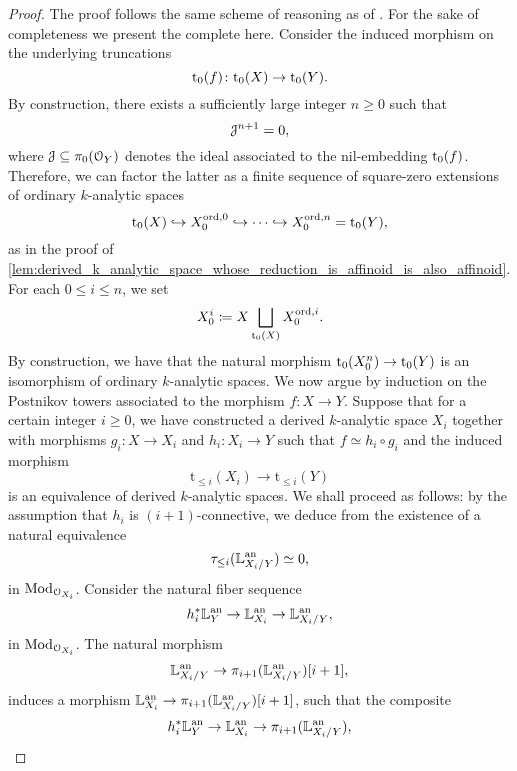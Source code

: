 \documentclass[10pt,a4paper,reqno]{amsart} %
\theoremstyle{plain}
\theoremstyle{definition}
\theoremstyle{remark}
\numberwithin{equation}{section}
\begin{document}
\begin{proof}
    The proof follows the same scheme of reasoning as of \cite[Proposition 5.5.3]{Gaitsgory_Study_II}. For the sake of completeness we present the complete here.
    Consider the induced morphism on the underlying truncations
        \[
            \mathrm{t}_0(f) \colon \mathrm{t}_0(X) \to \mathrm{t}_0(Y).   
        \]
    By construction, there exists a sufficiently large integer $n \ge 0$ such that
        \[
            \mathcal J^{n+1} = 0,  
        \]
    where $\mathcal J \subseteq \pi_0(\mathcal O_Y)$ denotes the ideal associated to the nil-embedding $\mathrm{t}_0(f)$.
    Therefore, we can factor the latter as a finite sequence of square-zero extensions of ordinary $k$-analytic spaces
        \[
            \mathrm{t}_0(X) \hookrightarrow X_0^{\mathrm{ord}, 0} \hookrightarrow \dots \hookrightarrow X^{\mathrm{ord}, n}_0 = \mathrm{t}_0(Y),
        \]
    as in the proof of \cref{lem:derived_k_analytic_space_whose_reduction_is_affinoid_is_also_affinoid}. For each $0 \le i \le n$, we set
        \[
            X_0^i \coloneqq X \bigsqcup_{\mathrm{t}_0(X)} X_0^{\mathrm{ord}, i}.
        \]
    By construction, we have that the natural morphism $\mathrm{t}_0(X_0^n) \to \mathrm{t}_0(Y)$ is an isomorphism of ordinary $k$-analytic spaces.
    We now argue by induction on the Postnikov towers associated to the morphism $f \colon X \to Y$.
    Suppose that for a certain integer $i \ge 0$, we have constructed a derived $k$-analytic space $X_i$ together with morphisms $g_i \colon
    X \to X_i$ and $h_i \colon X_i \to Y$ such that $f \simeq h_i \circ g_i$
    and the induced morphism
        \[
            \mathrm{t}_{\le i}(X_i) \to \mathrm{t}_{\le i}(Y)
        \]
    is an equivalence of derived $k$-analytic spaces. We shall proceed as follows: by the assumption that $h_i$ is $(i+1)$-connective, we deduce from
    \cite[Proposition 5.34]{Porta_Yu_Representability} the existence of a natural equivalence
        \[
            \tau_{\le i}(\mathbb L_{X_i/Y}^\mathrm{an}) \simeq 0,
        \]
    in $\mathrm{Mod}_{\mathcal O_{X_i}}$. Consider the natural fiber sequence
        \[
            h_i^* \mathbb L^\mathrm{an}_{Y} \to \mathbb L^\mathrm{an}_{X_i} \to \mathbb L^\mathrm{an}_{X_i/Y},
        \]
    in $\mathrm{Mod}_{\mathcal O_{X_i}}$. The natural morphism
        \[
            \mathbb L^\mathrm{an}_{X_i/ Y} \to \pi_{i+1}(\mathbb L^\mathrm{an}_{X_i/Y})[i+1],  
        \]
    induces a morphism $\mathbb L^\mathrm{an}_{X_i} \to \pi_{i+1}(\mathbb L^\mathrm{an}_{X_i/Y})[i+1]$, such that the composite
        \begin{equation} \label{eq:fiber_sequence_of_cotangent_complexes_to_produce_the_existence_of_the_desired_square_zero_extension_approximating_Y_in_degree_i+1}
            h_i^* \bbL\an_{Y} \to \bbL\an_{X_i} \to \pi_{i+1}(\bbL\an_{X_i/Y}),  

\end{equation}
\end{proof}
\end{document}
